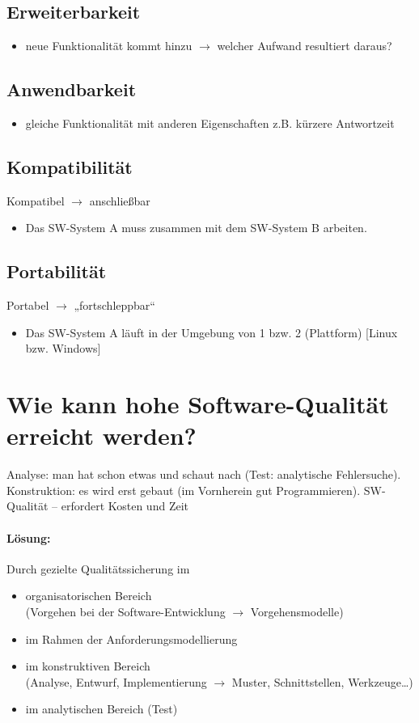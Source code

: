 \subsection{Erweiterbarkeit}
\begin{itemize}
\item neue Funktionalität kommt hinzu $\to$ welcher Aufwand resultiert daraus?
\end{itemize}

\subsection{Anwendbarkeit}
\begin{itemize}
\item gleiche Funktionalität mit anderen Eigenschaften z.B. kürzere Antwortzeit
\end{itemize}

\subsection{Kompatibilität}
Kompatibel $\to$ anschließbar
\begin{itemize}
\item Das SW-System A muss zusammen mit dem SW-System B arbeiten.
\end{itemize}

\subsection{Portabilität}
Portabel $\to$ „fortschleppbar“
\begin{itemize}
\item Das SW-System A läuft in der Umgebung von 1 bzw. 2 (Plattform) [Linux bzw. Windows]
\end{itemize}


\section{Wie kann hohe Software-Qualität erreicht werden?}
Analyse: man hat schon etwas und schaut nach (Test: analytische Fehlersuche).\\
Konstruktion: es wird erst gebaut (im Vornherein gut Programmieren).
SW-Qualität -- erfordert Kosten und Zeit
\paragraph{Lösung:}
Durch gezielte Qualitätssicherung im 
\begin{itemize}
\item organisatorischen Bereich\\
(Vorgehen bei der Software-Entwicklung $\to$ Vorgehensmodelle)
\item im Rahmen der Anforderungsmodellierung
\item im konstruktiven Bereich\\
(Analyse, Entwurf, Implementierung $\to$ Muster, Schnittstellen, Werkzeuge…)
\item im analytischen Bereich (Test)
\end{itemize}

